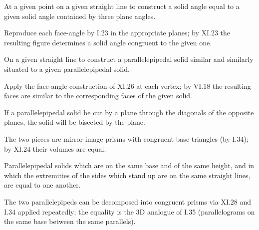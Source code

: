 \documentclass{rrxiv}
\begin{document}
\begin{claim}
\label{prop:XI.26}
At a given point on a given straight line to construct a solid angle
equal to a given solid angle contained by three plane angles.
\end{claim}
\begin{evidence}[Proof of XI.26]
\label{ev:XI.26}
Reproduce each face-angle by I.23 in the appropriate planes; by XI.23
the resulting figure determines a solid angle congruent to the given
one.
\end{evidence}

\begin{claim}
\label{prop:XI.27}
On a given straight line to construct a parallelepipedal solid
similar and similarly situated to a given parallelepipedal solid.
\end{claim}
\begin{evidence}[Proof of XI.27]
\label{ev:XI.27}
Apply the face-angle construction of XI.26 at each vertex; by VI.18
the resulting faces are similar to the corresponding faces of the
given solid.
\end{evidence}

\begin{claim}
\label{prop:XI.28}
If a parallelepipedal solid be cut by a plane through the diagonals
of the opposite planes, the solid will be bisected by the plane.
\end{claim}
\begin{evidence}[Proof of XI.28]
\label{ev:XI.28}
The two pieces are mirror-image prisms with congruent base-triangles
(by I.34); by XI.24 their volumes are equal.
\end{evidence}

\begin{claim}
\label{prop:XI.29}
Parallelepipedal solids which are on the same base and of the same
height, and in which the extremities of the sides which stand up are
on the same straight lines, are equal to one another.
\end{claim}
\begin{evidence}[Proof of XI.29]
\label{ev:XI.29}
The two parallelepipeds can be decomposed into congruent prisms via
XI.28 and I.34 applied repeatedly; the equality is the 3D analogue
of I.35 (parallelograms on the same base between the same parallels).
\end{evidence}
\end{document}
